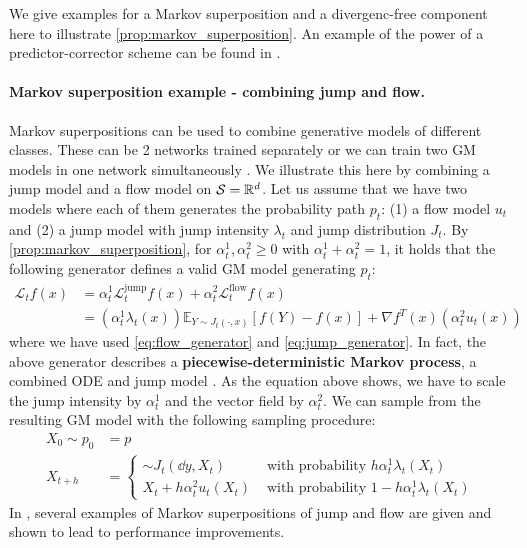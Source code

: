\documentclass{fairmeta}
\newcommand{\highlight}[1]{{\color{metablue} \textbf{#1}}}
\numberwithin{equation}{section}
\begin{document}
We give examples for a Markov superposition and a divergenc-free component here to illustrate \cref{prop:markov_superposition}. An example of the power of a predictor-corrector scheme can be found in \citep{gat2024discrete}.

\paragraph{Markov superposition example - combining jump and flow.} Markov superpositions can be used to combine generative models of different classes. These can be 2 networks trained separately or we can train two GM models in one network simultaneously \citep{holderrieth2024gm}. We illustrate this here by combining a jump model and a flow model on ${\mathcal{S}}=\mathbb{R}^d$. Let us assume that we have two models where each of them generates the probability path $p_t$: (1) a flow model $u_t$ and (2) a jump model with jump intensity $\lambda_t$ and jump distribution $J_t$. By \cref{prop:markov_superposition}, for $\alpha_t^1,\alpha_t^2\geq 0$ with $\alpha_t^1+\alpha_t^2=1$, it holds that the following generator defines a valid GM model generating $p_t$:
\begin{align*}
    \mathcal{L}_tf(x) &= \alpha_t^1 \mathcal{L}_t^{\text{jump}}f(x)+\alpha_t^2\mathcal{L}_t^{\text{flow}}f(x)\\
&=(\alpha_t^1\lambda_t(x))\mathbb{E}_{Y\sim J_t(\cdot,x)}[f(Y)-f(x)]+ \nabla f^T(x)(\alpha_t^2u_t(x))
\end{align*}
where we have used \cref{eq:flow_generator} and \cref{eq:jump_generator}. In fact, the above generator describes a \highlight{piecewise-deterministic Markov process}, a combined ODE and jump model \citep{davis1984piecewise}. As the equation above shows, we have to scale the jump intensity by $\alpha_t^1$ and the vector field by $\alpha_t^2$. We can sample from the resulting GM model with the following sampling procedure:
\begin{align*}
    X_0 \sim p_0&=p\\
    X_{t+h} &= \begin{cases}
        \sim J_t(\dd y,X_t) & \text{ with probability }h\alpha_t^1\lambda_t(X_t)\\
        X_{t} + h \alpha_t^2 u_t(X_t) & \text{ with probability }1-h\alpha_t^1\lambda_t(X_t)
    \end{cases} 
\end{align*}
In \citep{holderrieth2024gm}, several examples of Markov superpositions of jump and flow are given and shown to lead to performance improvements.
\end{document}

